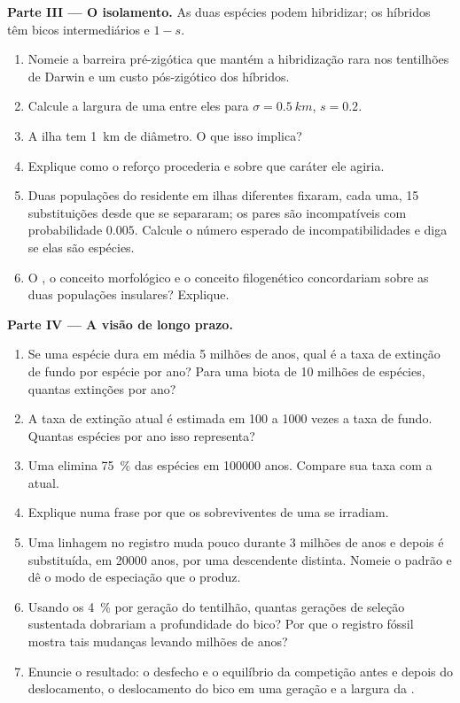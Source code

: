 \begin{problem}
\medskip
\noindent\textbf{Parte III --- O isolamento.}
As duas espécies podem hibridizar; os híbridos têm bicos intermediários e
 $1 - s$.
\begin{enumerate}[resume]
  \item Nomeie a barreira pré-zigótica que mantém a hibridização rara
        nos tentilhões de Darwin e um custo pós-zigótico dos
        híbridos.
  \item Calcule a largura de uma  entre eles para $\sigma
        = \qty{0.5}{km}$, $s = 0.2$.
  \item A ilha tem \qty{1}{km} de diâmetro. O que isso implica?
  \item Explique como o reforço procederia e sobre que caráter
        ele agiria.
  \item Duas populações do residente em ilhas diferentes fixaram, cada
        uma, 15 substituições desde que se separaram; os pares são
        incompatíveis com probabilidade $0.005$. Calcule o número esperado
        de incompatibilidades e diga se elas são espécies.
  \item O , o conceito morfológico e o
        conceito filogenético concordariam sobre as duas populações
        insulares? Explique.
\end{enumerate}

\medskip
\noindent\textbf{Parte IV --- A visão de longo prazo.}
\begin{enumerate}[resume]
  \item Se uma espécie dura em média 5 milhões de anos, qual é a taxa
        de extinção de fundo por espécie por ano? Para uma
        biota de 10 milhões de espécies, quantas extinções por ano?
  \item A taxa de extinção atual é estimada em 100 a 1000
        vezes a taxa de fundo. Quantas espécies por ano isso representa?
  \item Uma  elimina \qty{75}{\%} das espécies em
        \num{100000} anos. Compare sua taxa com a atual.
  \item Explique numa frase por que os sobreviventes de uma  se irradiam.
  \item Uma linhagem no registro muda pouco durante 3 milhões de anos e
        depois é substituída, em \num{20000} anos, por uma descendente
        distinta. Nomeie o padrão e dê o modo de especiação que o
        produz.
  \item Usando os \qty{4}{\%} por geração do tentilhão, quantas
        gerações de seleção sustentada dobrariam a profundidade do bico?
        Por que o registro fóssil mostra tais mudanças levando milhões
        de anos?
  \item Enuncie o resultado: o desfecho e o equilíbrio da competição
        antes e depois do deslocamento, o deslocamento do bico em uma
        geração e a largura da .
\end{enumerate}
\end{problem}
